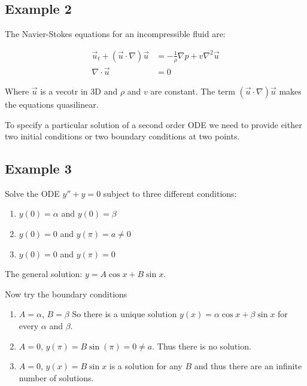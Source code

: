 \subsection*{Example 2}

The Navier-Stokes equations for an incompressible fluid are:

\begin{eqnarray*}
\vec{u}_t + (\vec{u} \cdot \nabla)\vec{u} &= - \frac{1}{\rho} \nabla p + v \nabla^2 \vec{u} \\
\nabla \cdot \vec{u} &= 0
\end{eqnarray*}

Where $\vec{u}$ is a vecotr in 3D and $\rho$ and $v$ are constant. The term $(\vec{u} \cdot \nabla)\vec{u}$ makes the equations quasilinear.

To specify a particular solution of a second order ODE we need to provide either two initial conditions or two boundary conditions at two points.

\subsection*{Example 3}

Solve the ODE $y'' + y = 0$ subject to three different conditions:

\begin{enumerate}

\item $y(0) = \alpha$ and $y(0) = \beta$
\item $y(0) = 0$ and $y(\pi) = a \neq 0$
\item $y(0) = 0$ and $y(\pi) = 0$

\end{enumerate}

The general solution: $y = A \cos x + B \sin x$.

\vspace{\baselineskip}

Now try the boundary conditions

\begin{enumerate}

\item $A = \alpha $, $B = \beta $ So there is a unique solution $y(x) = \alpha \cos x + \beta \sin x$ for every $\alpha$ and $\beta$.
\item $A = 0$, $y(\pi) = B \sin (\pi) = 0 \neq a$. Thus there is no solution.
\item $A = 0$, $y(x) = B \sin x$ is a solution for any $B$ and thus there are an infinite number of solutions.

\end{enumerate}